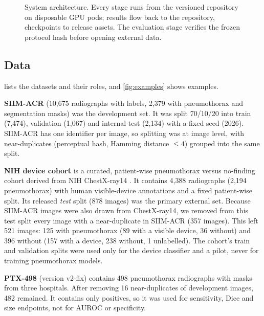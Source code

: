 \documentclass[final,3p]{elsarticle}
\begin{document}
\begin{figure}[!tbp]
\caption{System architecture. Every stage runs from the versioned repository on disposable GPU pods; results flow back to the repository, checkpoints to release assets. The evaluation stage verifies the frozen protocol hash before opening external data.}
\label{fig:system}
\end{figure}

\subsection{Data}
\label{sec:data}
 lists the datasets and their roles, and \cref{fig:examples} shows examples.

\textbf{SIIM-ACR} \citep{siim2019kaggle} (10{,}675 radiographs with labels, 2{,}379 with pneumothorax and segmentation masks) was the development set. It was split 70/10/20 into train (7{,}474), validation (1{,}067) and internal test (2{,}134) with a fixed seed (2026). SIIM-ACR has one identifier per image, so splitting was at image level, with near-duplicates (perceptual hash, Hamming distance $\le 4$) grouped into the same split.

\textbf{NIH device cohort} \citep{zamora2026cohort} is a curated, patient-wise pneumothorax versus no-finding cohort derived from NIH ChestX-ray14 \citep{wang2017chestxray8}. It contains 4{,}388 radiographs (2{,}194 pneumothorax) with human visible-device annotations and a fixed patient-wise split. Its released \emph{test} split (878 images) was the primary external set. Because SIIM-ACR images were also drawn from ChestX-ray14, we removed from this test split every image with a near-duplicate in SIIM-ACR (357 images). This left 521 images: 125 with pneumothorax (89 with a visible device, 36 without) and 396 without (157 with a device, 238 without, 1 unlabelled). The cohort's train and validation splits were used only for the device classifier and a pilot, never for training pneumothorax models.

\textbf{PTX-498} \citep{wang2021ptx498,wang2021deepsdm} (version v2-fix) contains 498 pneumothorax radiographs with masks from three hospitals. After removing 16 near-duplicates of development images, 482 remained. It contains only positives, so it was used for sensitivity, Dice and size endpoints, not for AUROC or specificity.
\end{document}
